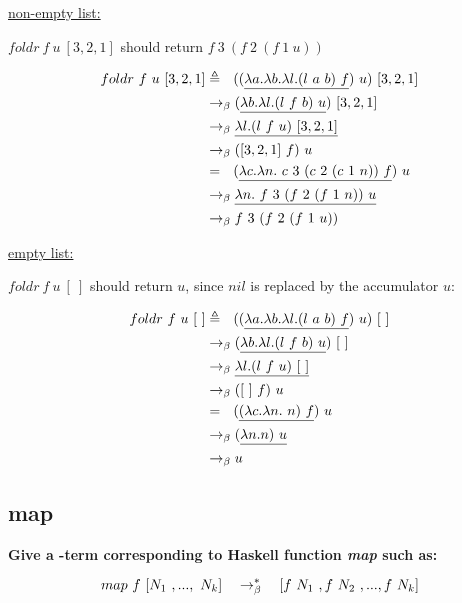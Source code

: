 \documentclass{article}
\begin{document}
\begin{Large}
		\underline{non-empty list:}
		\newline
		
		$foldr \ f \ u \ [3,2,1]$ should return $f \ 3 \ (f \ 2 \ (f \ 1 \ u))$
		
		\begin{align*}
			foldr \ f \ u \ [3,2,1] &\triangleq \saq ((\underline{\la a.\la b.\la l.(l \ a \ b) \ f}) \ u) \ [3,2,1] \\
			&\equals (\underline{\la b.\la l.(l \ f \ b) \ u}) \ [3,2,1] \\
			&\equals \underline{\la l.(l \ f \ u) \ [3,2,1]} \\
			&\equals  ([3,2,1] \ f) \ u \\
			&= \saq  (\underline{\la c.\la n. \ c \ 3 \ (c \ 2 \ (c \ 1 \ n)) \ f}) \ u \\
			&\equals \underline{\la n. \ f \ 3 \ (f \ 2 \ (f \ 1 \ n)) \ u} \\
			&\equals f \ 3 \ (f \ 2 \ (f \ 1 \ u))
		\end{align*}
		\newline
		
		\underline{empty list:}
		\newline
		
		$foldr \ f \ u \ [ \ ]$ should return $u$, since $nil$ is replaced by the accumulator $u$:
		
		\begin{align*}
			foldr \ f \ u \ [ \ ] &\triangleq \saq ((\underline{\la a.\la b.\la l.(l \ a \ b) \ f}) \ u) \ [ \ ] \\
			&\equals (\underline{\la b.\la l.(l \ f \ b) \ u}) \ [ \ ] \\
			&\equals \underline{\la l.(l \ f \ u) \ [ \ ]} \\
			&\equals ([ \ ] \ f) \ u \\
			&= \saq  (\underline{(\la c.\la n. \ n) \ f} )\ u \\
			&\equals (\underline{\la n.n) \ u} \\
			&\equals u
		\end{align*}
		\newpage
		
		
	\subsection{map}
		
		\textbf{Give a \lamb -term corresponding to Haskell function \textit{map} such as:}
		
		\begin{equation*}
			map \ f \ [N_1\ ,..., \ N_k] \quad \rightarrow_\beta^*\quad [f \ N_1 \ , f \ N_2 \ ,...,f \ N_k]
		\end{equation*}
		\newline
		

\end{Large}
\end{document}
